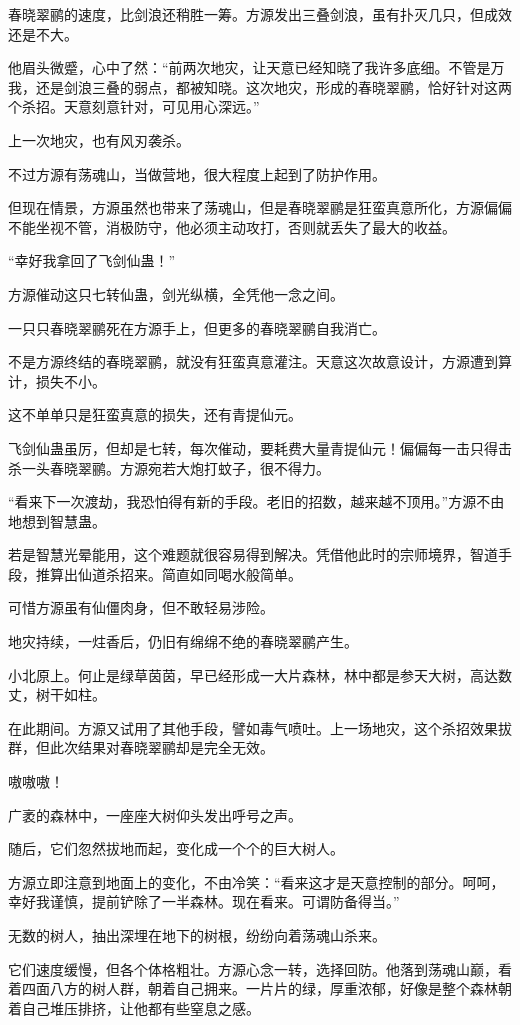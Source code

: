 \begin{this_body}
春晓翠鹂的速度，比剑浪还稍胜一筹。方源发出三叠剑浪，虽有扑灭几只，但成效还是不大。

他眉头微蹙，心中了然：“前两次地灾，让天意已经知晓了我许多底细。不管是万我，还是剑浪三叠的弱点，都被知晓。这次地灾，形成的春晓翠鹂，恰好针对这两个杀招。天意刻意针对，可见用心深远。”

上一次地灾，也有风刃袭杀。

不过方源有荡魂山，当做营地，很大程度上起到了防护作用。

但现在情景，方源虽然也带来了荡魂山，但是春晓翠鹂是狂蛮真意所化，方源偏偏不能坐视不管，消极防守，他必须主动攻打，否则就丢失了最大的收益。

“幸好我拿回了飞剑仙蛊！”

方源催动这只七转仙蛊，剑光纵横，全凭他一念之间。

一只只春晓翠鹂死在方源手上，但更多的春晓翠鹂自我消亡。

不是方源终结的春晓翠鹂，就没有狂蛮真意灌注。天意这次故意设计，方源遭到算计，损失不小。

这不单单只是狂蛮真意的损失，还有青提仙元。

飞剑仙蛊虽厉，但却是七转，每次催动，要耗费大量青提仙元！偏偏每一击只得击杀一头春晓翠鹂。方源宛若大炮打蚊子，很不得力。

“看来下一次渡劫，我恐怕得有新的手段。老旧的招数，越来越不顶用。”方源不由地想到智慧蛊。

若是智慧光晕能用，这个难题就很容易得到解决。凭借他此时的宗师境界，智道手段，推算出仙道杀招来。简直如同喝水般简单。

可惜方源虽有仙僵肉身，但不敢轻易涉险。

地灾持续，一炷香后，仍旧有绵绵不绝的春晓翠鹂产生。

小北原上。何止是绿草茵茵，早已经形成一大片森林，林中都是参天大树，高达数丈，树干如柱。

在此期间。方源又试用了其他手段，譬如毒气喷吐。上一场地灾，这个杀招效果拔群，但此次结果对春晓翠鹂却是完全无效。

嗷嗷嗷！

广袤的森林中，一座座大树仰头发出呼号之声。

随后，它们忽然拔地而起，变化成一个个的巨大树人。

方源立即注意到地面上的变化，不由冷笑：“看来这才是天意控制的部分。呵呵，幸好我谨慎，提前铲除了一半森林。现在看来。可谓防备得当。”

无数的树人，抽出深埋在地下的树根，纷纷向着荡魂山杀来。

它们速度缓慢，但各个体格粗壮。方源心念一转，选择回防。他落到荡魂山巅，看着四面八方的树人群，朝着自己拥来。一片片的绿，厚重浓郁，好像是整个森林朝着自己堆压排挤，让他都有些窒息之感。


\end{this_body}
